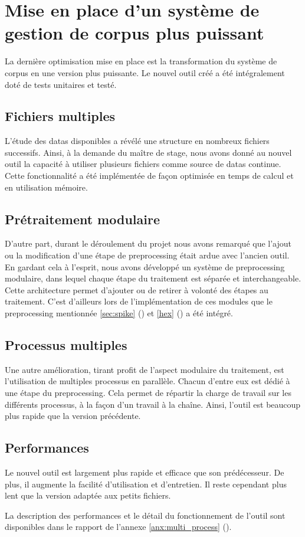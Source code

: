 \section{Mise en place d'un système de gestion de corpus plus puissant}\label{sec:papud_mulitiqueue}
La dernière optimisation mise en place est la transformation du système de corpus en une version plus puissante. Le nouvel outil créé a été intégralement doté de tests unitaires et testé.

\subsection{Fichiers multiples}
L'étude des \glspl{data} disponibles a révélé une structure en nombreux fichiers successifs.
Ainsi, à la demande du maître de stage, nous avons donné au nouvel outil la capacité à utiliser plusieurs fichiers comme source de \glspl{data} continue.
Cette fonctionnalité a été implémentée de façon optimisée en temps de calcul et en utilisation mémoire.

\subsection{Prétraitement modulaire}
D'autre part, durant le déroulement du projet nous avons remarqué que l'ajout ou la modification d'une étape de \gls{preprocessing} était ardue avec l'ancien outil.
En gardant cela à l'esprit, nous avons développé un système de \gls{preprocessing} modulaire, dans lequel chaque étape du traitement est séparée et interchangeable.
Cette architecture permet d'ajouter ou de retirer à volonté des étapes au traitement.
C'est d'ailleurs lors de l'implémentation de ces modules que le \gls{preprocessing} mentionnée \autoref{sec:spike} () et \autoref{hex} () a été intégré.

\subsection{Processus multiples}
Une autre amélioration, tirant profit de l'aspect modulaire du traitement, est l'utilisation de multiples processus en parallèle.
Chacun d'entre eux est dédié à une étape du \gls{preprocessing}.
Cela permet de répartir la charge de travail sur les différents processus, à la façon d'un travail à la chaîne.
Ainsi, l'outil est beaucoup plus rapide que la version précédente.

\subsection{Performances}
Le nouvel outil est largement plus rapide et efficace que son prédécesseur.
De plus, il augmente la facilité d'utilisation et d'entretien.
Il reste cependant plus lent que la version adaptée aux petits fichiers.

La description des performances et le détail du fonctionnement de l'outil sont disponibles dans le rapport de l'annexe \ref{anx:multi_process} ().
\pagebreak